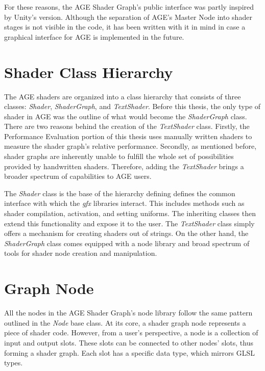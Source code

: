\documentclass[
  digital,     %
  oneside,     %
  nosansbold,  %
  nocolorbold, %
  lof,         %
  lot,         %
]{fithesis4}
\begin{document}
For these reasons, the AGE Shader Graph's public interface was partly inspired by Unity's version.
Although the separation of AGE's Master Node into shader stages is not visible in the code,
it has been written with it in mind in case a graphical interface for AGE is implemented
in the future.

\section{Shader Class Hierarchy}
The AGE shaders are organized into a class hierarchy that consists of three classes: \textit{Shader},
\textit{ShaderGraph}, and \textit{TextShader}. Before this thesis, the only type of shader in AGE
was the outline of what would become the \textit{ShaderGraph} class. There are two reasons
behind the creation of the \textit{TextShader} class. Firstly, the Performance Evaluation
portion of this thesis uses manually written shaders to measure the shader graph's relative performance.
Secondly, as mentioned before, shader graphs are inherently
unable to fulfill the whole set of possibilities provided by handwritten shaders. Therefore,
adding the \textit{TextShader} brings a broader spectrum of capabilities to AGE users.

The \textit{Shader} class is the base of the hierarchy defining defines the common interface
with which the \textit{gfx} libraries interact. This includes methods such as shader compilation,
activation, and setting uniforms. The inheriting classes then extend this functionality
and expose it to the user. The \textit{TextShader} class simply offers a mechanism for creating
shaders out of strings. On the other hand, the \textit{ShaderGraph} class comes equipped
with a node library and broad spectrum of tools for shader node creation and manipulation.

\section{Graph Node}
All the nodes in the AGE Shader Graph's node library follow the same pattern outlined
in the \textit{Node} base class. At its core, a shader graph node represents a piece of shader code.
However, from a user's perspective, a node is a collection of input and output slots. These slots
can be connected to other nodes' slots, thus forming a shader graph. Each slot has a specific
data type, which mirrors GLSL types.
\end{document}
